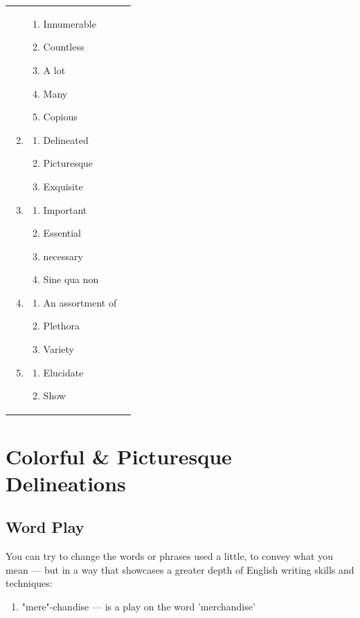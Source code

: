 \documentclass[oneside]{book}
\begin{document}
\begin{tabularx}{\textwidth}{XX}
\begin{enumerate}
\begin{enumerate}
            \item Innumerable 
            \item Countless
            \item A lot
            \item Many
            \item Copious
        \end{enumerate}
        \item \begin{enumerate}
            \item Delineated
            \item Picturesque
            \item Exquisite
        \end{enumerate}
        \item \begin{enumerate}
            \item  Important
            \item Essential 
            \item necessary
            \item Sine qua non 
        \end{enumerate}
        \item \begin{enumerate}
            \item An assortment of 
            \item Plethora
            \item Variety
        \end{enumerate}
        \item \begin{enumerate}
            \item Elucidate
            \item Show
        \end{enumerate}
    \end{enumerate}
  \end{tabularx}

  \section{Colorful \& Picturesque Delineations}
\subsection{Word Play}
You can try to change the words or phrases used a little, to convey what you mean --- but in a way that showcases a greater depth of English writing skills and techniques:
\begin{enumerate}
    \item "mere"-chandise --- is a play on the word 'merchandise'
\end{enumerate}
\end{document}
